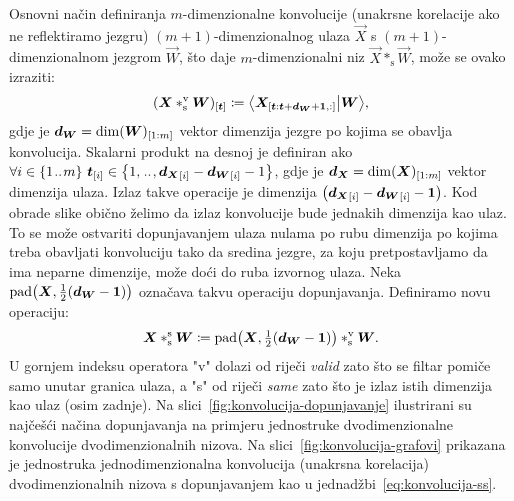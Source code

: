 \documentclass[utf8, diplomski, lmodern]{fer}
\begin{document}
Osnovni način definiranja $m$-dimenzionalne konvolucije (unakrsne korelacije ako ne reflektiramo jezgru) $(m+1)$-dimenzionalnog ulaza $\vec X$ s $(m+1)$-dimenzionalnom jezgrom $\vec W$, što daje $m$-dimenzionalni niz $\vec X*_\text{s}\vec W$, može se ovako izraziti:
\begin{align} \label{eq:konvolucija-sv}
(\vec X*_\text{s}^\text{v}\vec W)_\ind{\vec t} \coloneqq 
\braket{\vec X_\ind{\vec t:\vec t+ \vec d_{\vec W}+\cvec 1,:}}{\vec W} \text{,}
\end{align}
gdje je $\vec d_{\vec W} = \dim(\vec W)_\ind{1:m}$ vektor dimenzija jezgre po kojima se obavlja konvolucija. Skalarni produkt na desnoj je definiran ako $\forall i \in \cbr{1\bidot m}\ {\vec t}_\ind{i} \in \cbr{1,\bidot,{\vec d_{\vec X}}_\ind{i}-{\vec d_{\vec W}}_\ind{i}-1}$, gdje je $\vec d_{\vec X}=\dim(\vec X)_\ind{1:m}$ vektor dimenzija ulaza. Izlaz takve operacije je dimenzija $\del{{\vec d_{\vec X}}_\ind{i}-{\vec d_{\vec W}}_\ind{i}-\cvec 1}$.
Kod obrade slike obično želimo da izlaz konvolucije bude jednakih dimenzija kao ulaz. To se može ostvariti dopunjavanjem ulaza nulama po rubu dimenzija po kojima treba obavljati konvoluciju tako da sredina jezgre, za koju pretpostavljamo da ima neparne dimenzije, može doći do ruba izvornog ulaza. Neka $\mathrm{pad}\del{\vec X, \tfrac{1}{2}\del{\vec d_{\vec W}-\cvec 1}}$ označava takvu operaciju dopunjavanja. Definiramo novu operaciju:
\begin{align} \label{eq:konvolucija-ss}
\vec X *_\text{s}^\text{s} \vec W \coloneqq 
\mathrm{pad}\del{\vec X, \tfrac{1}{2}\del{\vec d_{\vec W}-\cvec 1}} *_\text{s}^\text{v} \vec W \text{.}
\end{align}
U gornjem indeksu operatora "v" dolazi od riječi \textit{valid} zato što se filtar pomiče samo unutar granica ulaza, a "s" od riječi \textit{same} zato što je izlaz istih dimenzija kao ulaz (osim zadnje). Na slici~\ref{fig:konvolucija-dopunjavanje} ilustrirani su najčešći načina dopunjavanja na primjeru jednostruke dvodimenzionalne konvolucije dvodimenzionalnih nizova. Na slici~\ref{fig:konvolucija-grafovi} prikazana je jednostruka jednodimenzionalna konvolucija (unakrsna korelacija) dvodimenzionalnih nizova s dopunjavanjem kao u jednadžbi~\eqref{eq:konvolucija-ss}. 
\end{document}
